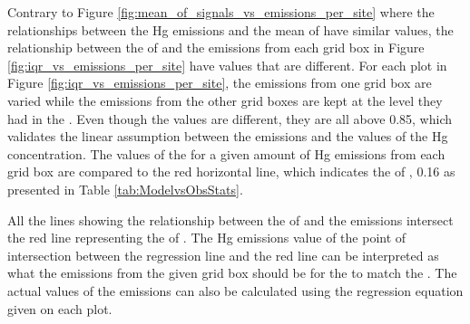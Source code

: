 \newpage
\begin{flushleft}
    Contrary to Figure \ref{fig:mean_of_signals_vs_emissions_per_site} where the relationships between the Hg emissions and the mean of \modelc have similar \rsq values, the relationship between the \iq of \modelc  and the emissions from each grid box in Figure \ref{fig:iqr_vs_emissions_per_site} have \rsq values that are different. For each plot in Figure \ref{fig:iqr_vs_emissions_per_site}, the emissions from one grid box are varied while the emissions from the other grid boxes are kept at the level they had in the \on. Even though the \rsq values are different, they are all above 0.85, which validates the linear assumption between the emissions and the \rsq values of the Hg concentration. The values of the \iq for a given amount of Hg emissions from each grid box are compared to the red horizontal line, which indicates the \iq of \obsC, 0.16 as presented in Table \ref{tab:ModelvsObsStats}. 
    
\end{flushleft}
\begin{flushleft}
     All the lines showing the relationship between the \iq of \modelc and the emissions intersect the red line representing the \iq of \obsC. The Hg emissions value of the point of intersection between the regression line and the red line can be interpreted as what the emissions from the given grid box should be for the \modelc to match the \obsC. The actual values of the emissions can also be calculated using the regression equation given on each plot. 
\end{flushleft}


